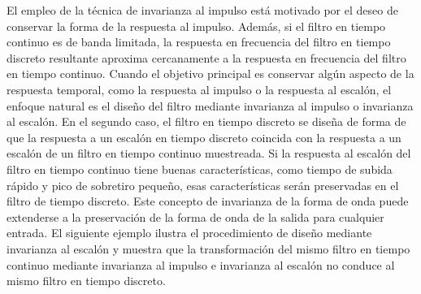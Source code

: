 \documentclass[a4paper]{report}
\begin{document}
El empleo de la técnica de invarianza al impulso está motivado por el deseo de conservar la forma de la respuesta al impulso. Además, si el filtro en tiempo continuo es de banda limitada, la respuesta en frecuencia del filtro en tiempo discreto resultante aproxima cercanamente a la respuesta en frecuencia del filtro en tiempo continuo. Cuando el objetivo principal es conservar algún aspecto de la respuesta temporal, como la respuesta al impulso o la respuesta al escalón, el enfoque natural es el diseño del filtro mediante invarianza al impulso o invarianza al escalón. En el segundo caso, el filtro en tiempo discreto se diseña de forma de que la respuesta a un escalón en tiempo discreto coincida con la respuesta a un escalón de un filtro en tiempo continuo muestreada. Si la respuesta al escalón del filtro en tiempo continuo tiene buenas características, como tiempo de subida rápido y pico de sobretiro pequeño, esas características serán preservadas en el filtro de tiempo discreto. Este concepto de invarianza de la forma de onda puede extenderse a la preservación de la forma de onda de la salida para cualquier entrada. El siguiente ejemplo ilustra el procedimiento de diseño mediante invarianza al escalón y muestra que la transformación del mismo filtro en tiempo continuo mediante invarianza al impulso e invarianza al escalón no conduce al mismo filtro en tiempo discreto. 
\end{document}
